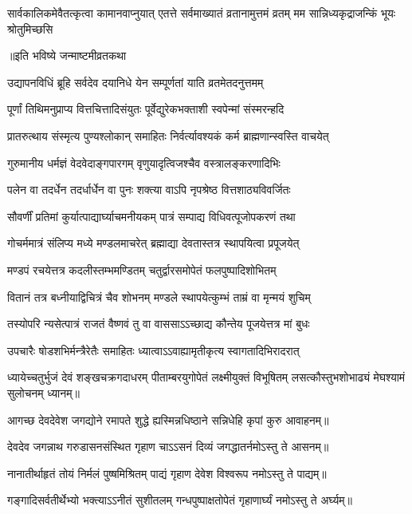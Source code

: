 \threelineshloka
{सार्वकालिकमेवैतत्कृत्वा कामानवाप्नुयात्}
{एतत्ते सर्वमाख्यातं व्रतानामुत्तमं व्रतम्}
{मम सान्निध्यकृद्राजन्किं भूयः श्रोतुमिच्छसि}%

\centerline{॥इति भविष्ये जन्माष्टमीव्रतकथा}



\twolineshloka
{उद्यापनविधिं ब्रूहि सर्वदेव दयानिधे}
{येन सम्पूर्णतां याति व्रतमेतदनुत्तमम्}

\twolineshloka
{पूर्णां तिथिमनुप्राप्य वित्तचित्तादिसंयुतः}
{पूर्वेद्युरेकभक्ताशी स्वपेन्मां संस्मरन्हदि}

\twolineshloka
{प्रातरुत्थाय संस्मृत्य पुण्यश्लोकान् समाहितः}
{निर्वर्त्यावश्यकं कर्म ब्राह्मणान्स्वस्ति वाचयेत्}

\twolineshloka
{गुरुमानीय धर्मज्ञं वेदवेदाङ्गपारगम्}
{वृणुयादृत्विजश्चैव वस्त्रालङ्करणादिभिः}

\twolineshloka
{पलेन वा तदर्धेन तदर्धार्धेन वा पुनः}
{शक्त्या वाऽपि नृपश्रेष्ठ वित्तशाठ्यविवर्जितः}

\twolineshloka
{सौवर्णीं प्रतिमां कुर्यात्पाद्यार्घ्याचमनीयकम्}
{पात्रं सम्पाद्य विधिवत्पूजोपकरणं तथा}

\twolineshloka
{गोचर्ममात्रं संलिप्य मध्ये मण्डलमाचरेत्}
{ब्रह्माद्या देवतास्तत्र स्थापयित्वा प्रपूजयेत्}

\twolineshloka
{मण्डपं रचयेत्तत्र कदलीस्तम्भमण्डितम्}
{चतुर्द्वारसमोपेतं फलपुष्पादिशोभितम्}

\twolineshloka
{वितानं तत्र बध्नीयाद्विचित्रं चैव शोभनम्}
{मण्डले स्थापयेत्कुम्भं ताम्रं वा मृन्मयं शुचिम्}

\twolineshloka
{तस्योपरि न्यसेत्पात्रं राजतं वैष्णवं तु वा}
{वाससाऽऽच्छाद्य कौन्तेय पूजयेत्तत्र मां बुधः}

\twolineshloka
{उपचारैः षोडशभिर्मन्त्रैरेतैः समाहितः}
{ध्यात्वाऽऽवाह्यामृतीकृत्य स्वागतादिभिरादरात्}

\threelineshloka
{ध्यायेच्चतुर्भुजं देवं शङ्खचक्रगदाधरम्}
{पीताम्बरयुगोपेतं लक्ष्मीयुक्तं विभूषितम्}
{लसत्कौस्तुभशोभाढ्यं मेघश्यामं सुलोचनम्}
ध्यानम्॥

\twolineshloka
{आगच्छ देवदेवेश जगद्योने रमापते}
{शुद्धे ह्यस्मिन्नधिष्ठाने सन्निधेहि कृपां कुरु}
आवाहनम्॥

\twolineshloka
{देवदेव जगन्नाथ गरुडासनसंस्थित}
{गृहाण चाऽऽसनं दिव्यं जगद्धातर्नमोऽस्तु ते}
आसनम्॥

\twolineshloka
{नानातीर्थाहृतं तोयं निर्मलं पुष्षमिश्रितम्}
{पाद्यं गृहाण देवेश विश्वरूप नमोऽस्तु ते}
पाद्यम्॥

\twolineshloka
{गङ्गादिसर्वतीर्थेभ्यो भक्त्याऽऽनीतं सुशीतलम्}
{गन्धपुष्पाक्षतोपेतं गृहाणार्घ्यं नमोऽस्तु ते}
अर्घ्यम्॥

